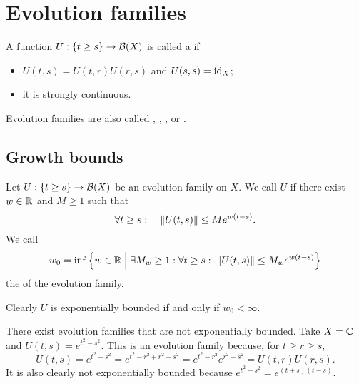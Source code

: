 \section{Evolution families}
\begin{definition}
A function $U: \{t\geq s\}\to \operatorname{\mathcal{B}}(X)$ is called a  if
\begin{itemize}
\item $U(t,s) = U(t,r)U(r,s)$ and $U(s,s) = \operatorname{id}_X$;
\item it is strongly continuous.
\end{itemize}
Evolution families are also called , ,
,  or .
\end{definition}

\subsection{Growth bounds}
\begin{definition}
Let $U: \{t\geq s\}\to \operatorname{\mathcal{B}}(X)$ be an evolution family on $X$. We call $U$  if there exist $w\in\mathbb{R}$ and $M\geq 1$ such that
\[ \forall t\geq s:\quad \lVert U(t,s)\rVert \leq M e^{w(t-s)}. \]
We call
\[ w_0 = \inf\left\{ w\in \mathbb{R} \;\middle|\; \exists M_w \geq 1: \forall t\geq s:\; \lVert U(t,s)\rVert \leq M_w e^{w(t-s)}  \right\} \]
the  of the evolution family.
\end{definition}
Clearly $U$ is exponentially bounded if and only if $w_0 < \infty$.

\begin{example}
There exist evolution families that are not exponentially bounded. Take $X = \mathbb{C}$ and $U(t,s) = e^{t^2 - s^2}$. This is an evolution family because, for $t\geq r\geq s$,
\[ U(t,s) = e^{t^2 - s^2} = e^{t^2 - r^2 + r^2 - s^2} = e^{t^2 - r^2}e^{r^2 - s^2} = U(t,r)U(r,s). \]
It is also clearly not exponentially bounded because $e^{t^2 - s^2} = e^{(t+s)(t-s)}$.
\end{example}

